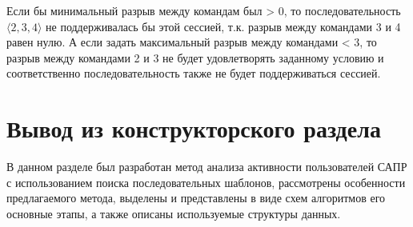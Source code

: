 Если бы минимальный разрыв между командам был > 0, то последовательность $\langle2,3,4\rangle$ не поддерживалась бы этой сессией, т.к. разрыв между командами 3 и 4 равен нулю. А если задать максимальный разрыв между командами < 3, то разрыв между командами 2 и 3 не  будет удовлетворять заданному условию и соответственно последовательность также не будет поддерживаться сессией.

\section*{Вывод из конструкторского раздела}
В данном разделе был разработан метод анализа активности пользователей САПР с использованием поиска последовательных шаблонов, рассмотрены особенности предлагаемого метода, выделены и представлены в виде схем алгоритмов его основные этапы, а также описаны используемые структуры данных.